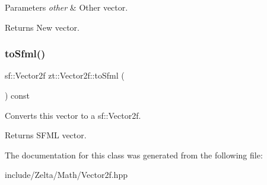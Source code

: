 \begin{DoxyParams}{Parameters}
{\em other} & Other vector. \\
\hline
\end{DoxyParams}
\begin{DoxyReturn}{Returns}
New vector. 
\end{DoxyReturn}
\mbox{\label{classzt_1_1_vector2f_aebb473f59fd05176a89031cad7b5e13a}} 
\subsubsection{\texorpdfstring{to\+Sfml()}{toSfml()}}
{\footnotesize\ttfamily sf\+::\+Vector2f zt\+::\+Vector2f\+::to\+Sfml (\begin{DoxyParamCaption}{ }\end{DoxyParamCaption}) const}

Converts this vector to a sf\+::\+Vector2f. \begin{DoxyReturn}{Returns}
S\+F\+ML vector. 
\end{DoxyReturn}


The documentation for this class was generated from the following file\+:\begin{DoxyCompactItemize}
\item 
include/\+Zelta/\+Math/Vector2f.\+hpp\end{DoxyCompactItemize}
